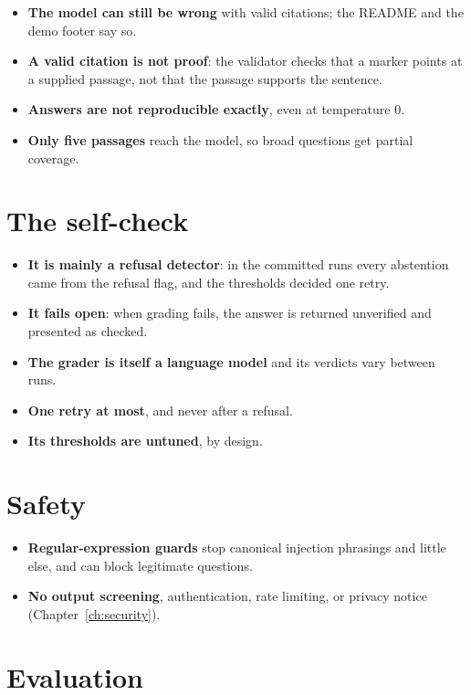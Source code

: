 \begin{itemize}
  \item \textbf{The model can still be wrong} with valid citations; the README and the demo footer say so.
  \item \textbf{A valid citation is not proof}: the validator checks that a marker points at a supplied passage, not that the passage supports the sentence.
  \item \textbf{Answers are not reproducible exactly}, even at temperature 0.
  \item \textbf{Only five passages} reach the model, so broad questions get partial coverage.
\end{itemize}

\section{The self-check}

\begin{itemize}
  \item \textbf{It is mainly a refusal detector}: in the committed runs every abstention came from the refusal flag, and the thresholds decided one retry.
  \item \textbf{It fails open}: when grading fails, the answer is returned unverified and presented as checked.
  \item \textbf{The grader is itself a language model} and its verdicts vary between runs.
  \item \textbf{One retry at most}, and never after a refusal.
  \item \textbf{Its thresholds are untuned}, by design.
\end{itemize}

\section{Safety}

\begin{itemize}
  \item \textbf{Regular-expression guards} stop canonical injection phrasings and little else, and can block legitimate questions.
  \item \textbf{No output screening}, authentication, rate limiting, or privacy notice (Chapter~\ref{ch:security}).
\end{itemize}

\section{Evaluation}

